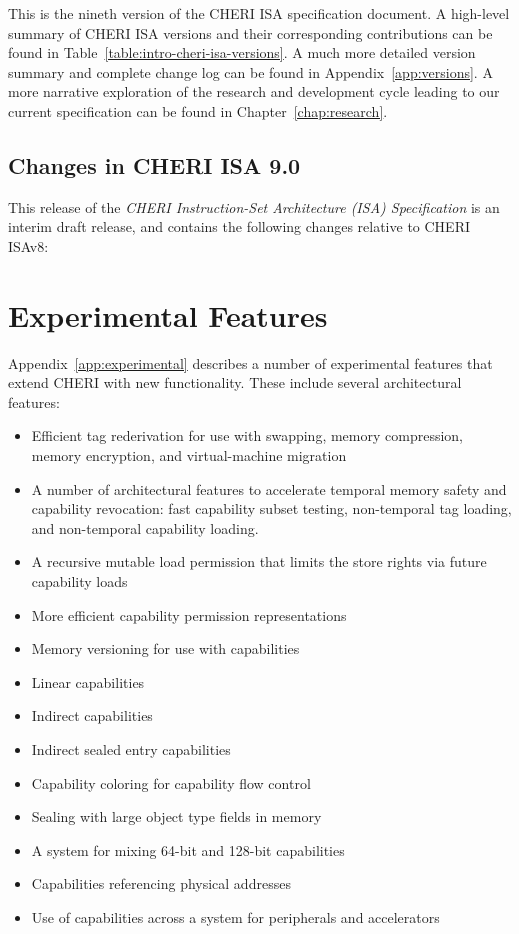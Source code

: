 This is the nineth version of the CHERI ISA specification document.
A high-level summary of CHERI ISA versions and their corresponding
contributions can be found in Table~\ref{table:intro-cheri-isa-versions}.
A much more detailed version summary and complete change log can be found in
Appendix~\ref{app:versions}.
A more narrative exploration of the research and development cycle leading to
our current specification can be found in Chapter~\ref{chap:research}.

\subsection{Changes in CHERI ISA 9.0}

This release of the \textit{CHERI Instruction-Set Architecture (ISA)
Specification} is an interim draft release, and contains the following
changes relative to CHERI ISAv8:



\section{Experimental Features}
\label{sec:intro:experimental}


Appendix~\ref{app:experimental} describes a number of experimental features
that extend CHERI with new functionality.
These include several architectural features:

\begin{itemize}
\item Efficient tag rederivation for use with swapping, memory compression,
  memory encryption, and virtual-machine migration
\item A number of architectural features to accelerate temporal memory safety
  and capability revocation: fast capability subset testing, non-temporal
  tag loading, and non-temporal capability loading.
\item A recursive mutable load permission that limits the store rights
  via future capability loads
\item More efficient capability permission representations
\item Memory versioning for use with capabilities
\item Linear capabilities
\item Indirect capabilities
\item Indirect sealed entry capabilities
\item Capability coloring for capability flow control
\item Sealing with large object type fields in memory
\item A system for mixing 64-bit and 128-bit capabilities
\item Capabilities referencing physical addresses
\item Use of capabilities across a system for peripherals and accelerators
\end{itemize}

